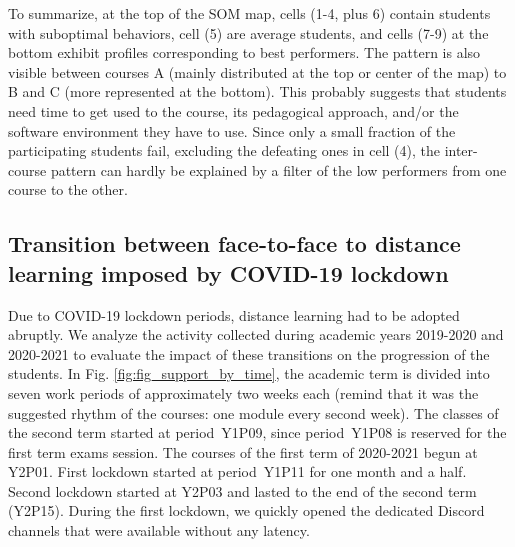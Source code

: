 \documentclass{aims}
\theoremstyle{definition}
\begin{document}
To summarize, at the top of the SOM map, cells (1-4, plus 6) contain
students with suboptimal behaviors, cell (5) are average students, and
cells (7-9) at the bottom exhibit profiles corresponding to best
performers. The pattern is also visible between courses A (mainly
distributed at the top or center of the map) to B and C (more
represented at the bottom). This probably suggests that students need
time to get used to the course, its pedagogical approach, and/or the
software environment they have to use. Since only a small fraction of
the participating students fail, excluding the defeating ones in cell
(4), the inter-course pattern can hardly be explained by a filter of the
low performers from one course to the other.

\hypertarget{transition-between-face-to-face-to-distance-learning-imposed-by-covid-19-lockdown-1}{%
\subsection{Transition between face-to-face to distance learning imposed
by COVID-19
lockdown}\label{transition-between-face-to-face-to-distance-learning-imposed-by-covid-19-lockdown-1}}

Due to COVID-19 lockdown periods, distance learning had to be adopted
abruptly. We analyze the activity collected during academic years
2019-2020 and 2020-2021 to evaluate the impact of these transitions on
the progression of the students. In Fig. \ref {fig:fig_support_by_time},
the academic term is divided into seven work periods of approximately
two weeks each (remind that it was the suggested rhythm of the courses:
one module every second week). The classes of the second term started at
period~Y1P09, since period~Y1P08 is reserved for the first term exams
session. The courses of the first term of 2020-2021 begun at Y2P01.
First lockdown started at period~Y1P11 for one month and a half. Second
lockdown started at Y2P03 and lasted to the end of the second term
(Y2P15). During the first lockdown, we quickly opened the dedicated
Discord channels that were available without any latency.
\end{document}
